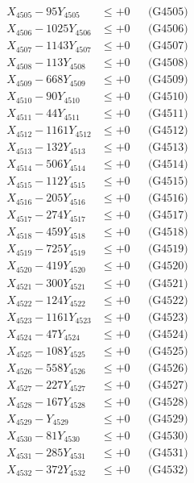 \documentclass[a4paper,10pt]{article}
\begin{document}
{\begin{align}
X_{4505} - 95Y_{4505} &\leq +0 && \text{(G4505)} \\
X_{4506} - 1025Y_{4506} &\leq +0 && \text{(G4506)} \\
X_{4507} - 1143Y_{4507} &\leq +0 && \text{(G4507)} \\
X_{4508} - 113Y_{4508} &\leq +0 && \text{(G4508)} \\
X_{4509} - 668Y_{4509} &\leq +0 && \text{(G4509)} \\
X_{4510} - 90Y_{4510} &\leq +0 && \text{(G4510)} \\
\allowbreak
X_{4511} - 44Y_{4511} &\leq +0 && \text{(G4511)} \\
X_{4512} - 1161Y_{4512} &\leq +0 && \text{(G4512)} \\
X_{4513} - 132Y_{4513} &\leq +0 && \text{(G4513)} \\
X_{4514} - 506Y_{4514} &\leq +0 && \text{(G4514)} \\
X_{4515} - 112Y_{4515} &\leq +0 && \text{(G4515)} \\
X_{4516} - 205Y_{4516} &\leq +0 && \text{(G4516)} \\
X_{4517} - 274Y_{4517} &\leq +0 && \text{(G4517)} \\
X_{4518} - 459Y_{4518} &\leq +0 && \text{(G4518)} \\
X_{4519} - 725Y_{4519} &\leq +0 && \text{(G4519)} \\
X_{4520} - 419Y_{4520} &\leq +0 && \text{(G4520)} \\
\allowbreak
X_{4521} - 300Y_{4521} &\leq +0 && \text{(G4521)} \\
X_{4522} - 124Y_{4522} &\leq +0 && \text{(G4522)} \\
X_{4523} - 1161Y_{4523} &\leq +0 && \text{(G4523)} \\
X_{4524} - 47Y_{4524} &\leq +0 && \text{(G4524)} \\
X_{4525} - 108Y_{4525} &\leq +0 && \text{(G4525)} \\
X_{4526} - 558Y_{4526} &\leq +0 && \text{(G4526)} \\
X_{4527} - 227Y_{4527} &\leq +0 && \text{(G4527)} \\
X_{4528} - 167Y_{4528} &\leq +0 && \text{(G4528)} \\
X_{4529} - Y_{4529} &\leq +0 && \text{(G4529)} \\
X_{4530} - 81Y_{4530} &\leq +0 && \text{(G4530)} \\
\allowbreak
X_{4531} - 285Y_{4531} &\leq +0 && \text{(G4531)} \\
X_{4532} - 372Y_{4532} &\leq +0 && \text{(G4532)} \\

\end{align}}
\end{document}
